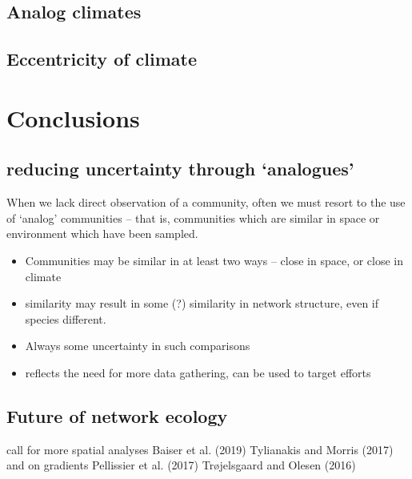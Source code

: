 \hypertarget{analog-climates}{%
\subsection{Analog climates}\label{analog-climates}}

\hypertarget{eccentricity-of-climate}{%
\subsection{Eccentricity of climate}\label{eccentricity-of-climate}}

\hypertarget{conclusions}{%
\section{Conclusions}\label{conclusions}}

\hypertarget{reducing-uncertainty-through-analogues}{%
\subsection{reducing uncertainty through
`analogues'}\label{reducing-uncertainty-through-analogues}}

When we lack direct observation of a community, often we must resort to
the use of `analog' communities -- that is, communities which are
similar in space or environment which have been sampled.

\begin{itemize}
\tightlist
\item
  Communities may be similar in at least two ways -- close in space, or
  close in climate
\item
  similarity may result in some (?) similarity in network structure,
  even if species different.
\item
  Always some uncertainty in such comparisons
\item
  reflects the need for more data gathering, can be used to target
  efforts
\end{itemize}

\hypertarget{future-of-network-ecology}{%
\subsection{Future of network ecology}\label{future-of-network-ecology}}

call for more spatial analyses Baiser et al. (2019) Tylianakis and
Morris (2017) and on gradients Pellissier et al. (2017) Trøjelsgaard and
Olesen (2016)

